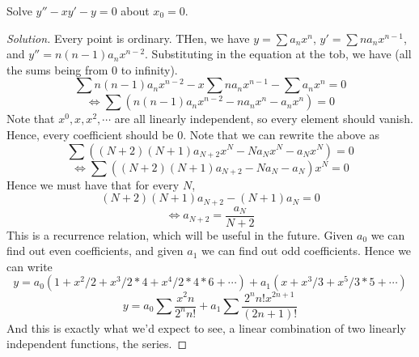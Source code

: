 \begin{example}
  Solve $y''-xy'-y=0$ about $x_0=0$.
\end{example}
\begin{proof}[Solution]
  Every point is ordinary. THen, we have $y=\sum a_n x^n$, $y'=\sum na_nx^{n-1}$, and
  $y''=n(n-1)a_nx^{n-2}$. Substituting in the equation at the tob, we have (all the sums
  being from 0 to infinity).
  \[ \sum n(n-1)a_nx^{n-2} - x\sum na_nx^{n-1} - \sum a_n x^n = 0\] 
  \[\iff \sum (n (n-1)a_n x^{n-2} - na_nx^{n} - a_n x^n ) = 0\]
  Note that $x^0,x,x^2,\cdots$ are all linearly independent, so every element should
  vanish. Hence, every coefficient should be 0. Note that we can rewrite the above as 
  \[\sum ((N+2)(N+1)a_{N+2} x^N - Na_Nx^N - a_Nx^N)=0\]
  \[\iff\sum ((N+2)(N+1)a_{N+2}  - Na_N - a_N)x^N=0\]
  Hence we must have that for every $N$, 
  \[(N+2)(N+1)a_{N+2} - (N+1)a_N = 0\]
  \[\iff a_{N+2}= \frac{a_N}{N+2}\]
  This is a recurrence relation, which will be useful in the future. Given $a_0$ we can
  find out even coefficients, and given $a_1$ we can find out odd coefficients.
  Hence we can write
  \[y = a_{0} (1+ x^{2}/2 + x^{3}/2*4 + x^{4}/2*4*6+\cdots) + a_1(x + x^3/3 + x^{5}/3*5 +
  \cdots) \]
  \[y= a_{0}\sum \frac{x^2n}{2^n n!} + a_1 \sum \frac{2^n n! x^{2n+1}}{(2n+1)!}\]
  And this is exactly what we'd expect to see, a linear combination of two linearly
  independent functions, the series.


\end{proof}

